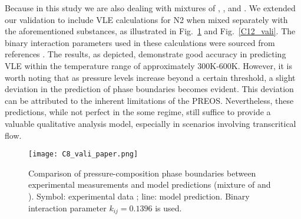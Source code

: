 Because in this study we are also dealing with mixtures of , , and . We extended our validation to include VLE calculations for N2 when mixed separately with the aforementioned substances, as illustrated in Fig.~\ref{C8_vali} and Fig.~\ref{C12_vali}. The binary interaction parameters used in these calculations were sourced from references \cite{eliosa2009vapor,garcia2011vapor}. The results, as depicted, demonstrate good accuracy in predicting VLE within the temperature range of approximately 300K-600K. However, it is worth noting that as pressure levels increase beyond a certain threshold, a slight deviation in the prediction of phase boundaries becomes evident. This deviation can be attributed to the inherent limitations of the PREOS. Nevertheless, these predictions, while not perfect in the some regime, still suffice to provide a valuable qualitative analysis model, especially in scenarios involving transcritical flow.


    \begin{figure}[htbp]
        \centering
        \texttt{[image: C8\_vali\_paper.png]}
        \centering
        \caption{Comparison of pressure-composition phase boundaries between experimental measurements and model predictions (mixture of  and ). Symbol: experimental data \cite{llave1988vapor}; line: model prediction. Binary interaction parameter $k_{ij}=0.1396$ is used.}
        \label{C8_vali}
    \end{figure}

